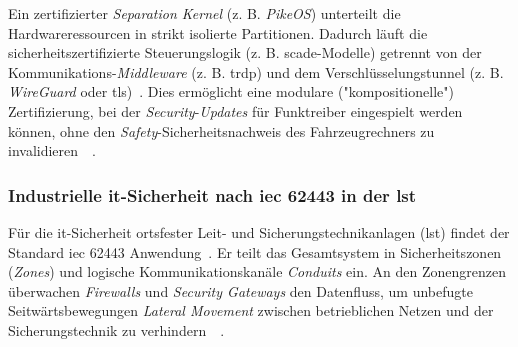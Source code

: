 \documentclass[runningheads]{res/llncs}
\begin{document}
Ein zertifizierter \textit{Separation Kernel} (z. B. \textit{PikeOS}) unterteilt die Hardwareressourcen in strikt isolierte Partitionen. Dadurch läuft die sicherheitszertifizierte Steuerungslogik (z. B. \gls{scade}-Modelle) getrennt von der Kommunikations-\textit{Middleware} (z. B. \gls{trdp}) und dem Verschlüsselungstunnel (z. B. \textit{WireGuard} oder \gls{tls})~\parencite[S. 32--34]{schulzIntegration2019}. Dies ermöglicht eine modulare ("kompositionelle") Zertifizierung, bei der \textit{Security}-\textit{Updates} für Funktreiber eingespielt werden können, ohne den \textit{Safety}-Sicherheitsnachweis des Fahrzeugrechners zu invalidieren~\parencite[S. 31, 35]{schulzIntegration2019}~\parencite[S. 83]{tverdyshevCertMILS2019}.

\subsubsection{\texorpdfstring{Industrielle \gls{it}-Sicherheit nach \gls{iec} 62443 in der \gls{lst}}{Industrielle IT-Sicherheit nach IEC 62443 in der LST}}
\label{sec:Industrielle_IT-Sicherheit_nach_IEC_62443_in_der_LST}
Für die \gls{it}-Sicherheit ortsfester Leit- und Sicherungstechnikanlagen (\gls{lst}) findet der Standard \gls{iec} 62443 Anwendung~\parencite[S. 31, 33]{schulzIntegration2019}.
Er teilt das Gesamtsystem in Sicherheitszonen (\textit{Zones}) und logische Kommunikationskanäle \textit{Conduits} ein. An den Zonengrenzen überwachen \textit{Firewalls} und \textit{Security Gateways} den Datenfluss, um unbefugte Seitwärtsbewegungen \textit{Lateral Movement} zwischen betrieblichen Netzen und der Sicherungstechnik zu verhindern~\parencite[S. 33]{schulzIntegration2019}~\parencite[S. 43]{h.tsukisawaStandardization2024}. %

\end{document}
